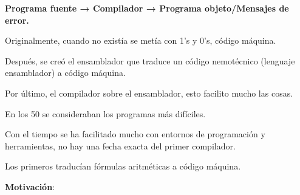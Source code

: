 \documentclass[12pt, twoside, openright]{report} %
\begin{document}
\begin{figure}[H]
{}
\end{figure}

\textbf{Programa fuente → Compilador → Programa objeto/Mensajes de
	error.}

Originalmente, cuando no existía se metía con 1's y 0's, código máquina.

Después, se creó el ensamblador que traduce un código nemotécnico
(lenguaje ensamblador) a código máquina.

Por último, el compilador sobre el ensamblador, esto facilito mucho las
cosas.

En los 50 se consideraban los programas más difíciles.

Con el tiempo se ha facilitado mucho con entornos de programación y
herramientas, no hay una fecha exacta del primer compilador.

Los primeros traducían fórmulas aritméticas a código máquina.

\textbf{Motivación}:
\end{document}
